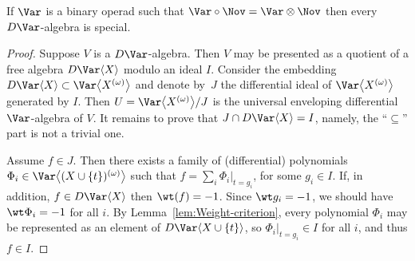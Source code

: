 \begin{Theorem}\label{thm:Weight-Embedding}
If
$\Var $ is a binary operad such that
$\Var\circ \Nov = \Var\otimes \Nov $
then every $D\Var $-algebra is special.
\end{Theorem}

\begin{proof}
Suppose $V$ is a $D\Var $-algebra.
Then $V$ may be presented as a quotient
of a free algebra $D\Var\langle X\rangle $ modulo an ideal $I$.
Consider the embedding $D\Var\langle X\rangle \subset \Var\bigl\langle X^{(\omega )}\bigr\rangle $
and denote by~$J$ the differential ideal of $\Var\bigl\langle X^{(\omega )}\bigr\rangle $
generated by $I$.
Then $U = \Var \bigl\langle X^{(\omega )}\bigr\rangle /J$ is the universal enveloping
differential $\Var $-algebra of $V$. It remains to prove that $J\cap D\Var\langle X\rangle = I$,
namely, the ``$\subseteq $'' part is not a trivial one.

Assume $f\in J$. Then there exists a family of (differential) polynomials
$\Phi_i \in \Var\bigl\langle (X\cup\{t\})^{(\omega )} \bigr\rangle $
such that $f = \sum_i \Phi_i|_{t=g_i}$, for some $g_i\in I$.
If, in addition, $f\in D\Var\langle X\rangle $ then
$\wt (f)=-1$. Since $\wt g_i=-1$, we should have $\wt \Phi_i=-1$ for all $i$.
By Lemma~\ref{lem:Weight-criterion}, every polynomial $\Phi_i$ may be
represented as an element of $D\Var\langle X\cup\{t\}\rangle $,
so $\Phi_i|_{t=g_i} \in I$ for all $i$, and thus $f\in I$.
\end{proof}
